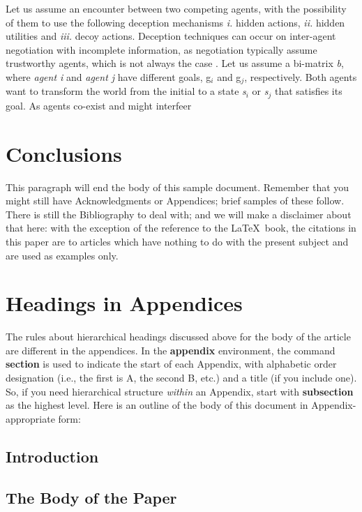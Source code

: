 Let us assume an encounter between two competing agents, with the possibility of them to use the following deception mechanisms \textit{i.} hidden actions, \textit{ii.} hidden utilities and \textit{iii.} decoy actions. Deception techniques can occur on inter-agent negotiation with incomplete information, as negotiation typically assume trustworthy agents, which is not always the case \cite{inproceedingsa}. Let us assume a bi-matrix \textit{b}, where \textit{agent i} and \textit{agent j} have different goals, g$_i$ and g$_j$, respectively. Both agents want to transform the world from the initial to a state \textit{s$_i$} or \textit{s$_j$} that satisfies its goal. As agents co-exist and might interfeer 

\section{Conclusions}
This paragraph will end the body of this sample document.
Remember that you might still have Acknowledgments or
Appendices; brief samples of these
follow.  There is still the Bibliography to deal with; and
we will make a disclaimer about that here: with the exception
of the reference to the \LaTeX\ book, the citations in
this paper are to articles which have nothing to
do with the present subject and are used as
examples only.



\appendix
\section{Headings in Appendices}
The rules about hierarchical headings discussed above for
the body of the article are different in the appendices.
In the \textbf{appendix} environment, the command
\textbf{section} is used to
indicate the start of each Appendix, with alphabetic order
designation (i.e., the first is A, the second B, etc.) and
a title (if you include one).  So, if you need
hierarchical structure
\textit{within} an Appendix, start with \textbf{subsection} as the
highest level. Here is an outline of the body of this
document in Appendix-appropriate form:
\subsection{Introduction}
\subsection{The Body of the Paper}
